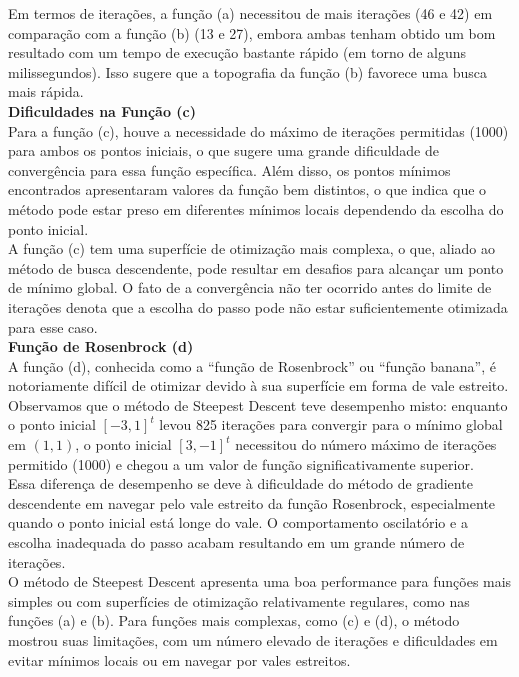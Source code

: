 \documentclass[a4paper, 12pt]{article}
\begin{document}
Em termos de iterações, a função (a) necessitou de mais iterações (46 e 42) em comparação com a função (b) (13 e 27), embora ambas tenham obtido um bom resultado com um tempo de execução bastante rápido (em torno de alguns milissegundos). Isso sugere que a topografia da função (b) favorece uma busca mais rápida.\\

\textbf{Dificuldades na Função (c)}\\
Para a função (c), houve a necessidade do máximo de iterações permitidas (1000) para ambos os pontos iniciais, o que sugere uma grande dificuldade de convergência para essa função específica. Além disso, os pontos mínimos encontrados apresentaram valores da função bem distintos, o que indica que o método pode estar preso em diferentes mínimos locais dependendo da escolha do ponto inicial.\\

A função (c) tem uma superfície de otimização mais complexa, o que, aliado ao método de busca descendente, pode resultar em desafios para alcançar um ponto de mínimo global. O fato de a convergência não ter ocorrido antes do limite de iterações denota que a escolha do passo pode não estar suficientemente otimizada para esse caso.\\

\textbf{Função de Rosenbrock (d)}\\
A função (d), conhecida como a ``função de Rosenbrock'' ou ``função banana'', é notoriamente difícil de otimizar devido à sua superfície em forma de vale estreito. Observamos que o método de Steepest Descent teve desempenho misto: enquanto o ponto inicial $[-3, 1]^t$ levou 825 iterações para convergir para o mínimo global em $(1, 1)$, o ponto inicial $[3, -1]^t$ necessitou do número máximo de iterações permitido (1000) e chegou a um valor de função significativamente superior.\\

Essa diferença de desempenho se deve à dificuldade do método de gradiente descendente em navegar pelo vale estreito da função Rosenbrock, especialmente quando o ponto inicial está longe do vale. O comportamento oscilatório e a escolha inadequada do passo acabam resultando em um grande número de iterações.\\

O método de Steepest Descent apresenta uma boa performance para funções mais simples ou com superfícies de otimização relativamente regulares, como nas funções (a) e (b). Para funções mais complexas, como (c) e (d), o método mostrou suas limitações, com um número elevado de iterações e dificuldades em evitar mínimos locais ou em navegar por vales estreitos.\\
\end{document}
